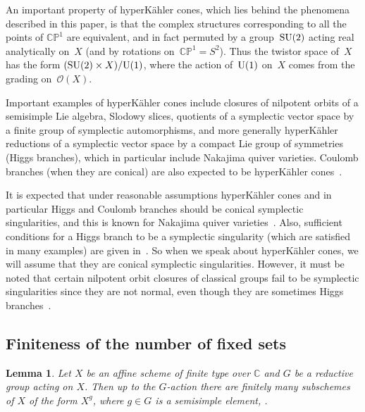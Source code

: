 \documentclass[pdftex]{sigma}
\numberwithin{equation}{section}
\newtheorem{Lemma}[Theorem]{Lemma}
\begin{document}
An important property of hyperK\"ahler cones, which lies behind the phenomena described in this paper, is that the complex structures corresponding to all the points of ${\mathbb C}{\mathbb P}^1$ are equivalent, and in fact permuted by a group~${\rm SU}(2)$ acting real analytically on~$X$ (and by rotations on~\mbox{${\mathbb C}{\mathbb P}^1=S^2$}). Thus the twistor space of~$X$ has the form $({\rm SU}(2)\times X)/{\rm U}(1)$, where the action of~${\rm U}(1)$ on~$X$ comes from the grading on~$\mathcal O(X)$.

Important examples of hyperK\"ahler cones include closures of nilpotent orbits of a semisimple Lie algebra, Slodowy slices, quotients of a symplectic vector space by a finite group of symplectic automorphisms, and more generally hyperK\"ahler reductions of a symplectic vector space by a compact Lie group of symmetries (Higgs branches), which in particular include Nakajima quiver varieties. Coulomb branches (when they are conical) are also expected to be hyperK\"ahler cones~\cite{Nak}.

It is expected that under reasonable assumptions hyperK\"ahler cones and in particular Higgs and Coulomb branches should be conical symplectic singularities, and this is known for Nakajima quiver varieties~\cite{BS}. Also, sufficient conditions for a Higgs branch to be a symplectic singularity (which are satisfied in many examples) are given in~\cite{HSS}. So when we speak about hyperK\"ahler cones, we will assume that they are conical symplectic singularities. However, it must be noted that certain nilpotent orbit closures of classical groups fail to be symplectic singularities since they are not normal, even though they are sometimes Higgs branches~\cite{KP}.

\subsection{Finiteness of the number of fixed sets}

\begin{Lemma}\label{finfix} Let $X$ be an affine scheme of finite type over ${\mathbb C}$ and
$G$ be a reductive group acting on $X$. Then up to the $G$-action there are finitely many subschemes
of $X$ of the form $X^g$, where $g\in G$ is a semisimple element, .
\end{Lemma}
\end{document}
